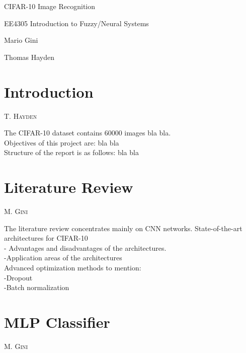 \documentclass[12pt, a4paper]{article}
\makeatletter
\newcommand{\sectionauthor}[1]{%
  {\parindent0pt\vspace*{-5pt}%
  \linespread{1.1}\large\scshape#1%
  \par\nobreak\vspace*{15pt}}
  \@afterheading%
}
\numberwithin{equation}{section}
\makeatother
\begin{document}
    \begin{titlepage}

    \begin{center}
    \vspace*{6cm}
    \centering
    \Huge
    { CIFAR-10 Image Recognition }
    \vspace{2cm}

    \Huge
    {EE4305 Introduction to Fuzzy/Neural Systems}
    \vspace{0.5cm}
    
    \Large
    {Mario Gini

    Thomas Hayden}
    \vfill
    \vspace{0.8cm}
    \end{center}
    \end{titlepage}

    \newpage
    \tableofcontents
\section{Introduction}
    \pagestyle{tom}
    \sectionauthor{T. Hayden}
    
The CIFAR-10 dataset contains 60000 images bla bla.\\
Objectives of this project are: bla bla\\
Structure of the report is as follows: bla bla\\

\section{Literature Review}
     \pagestyle{mario}
     \sectionauthor{M. Gini}
     
The literature review concentrates mainly on CNN networks. State-of-the-art architectures for CIFAR-10\\
- Advantages and disadvantages of the architectures.\\

-Application areas of the architectures\\

Advanced optimization methods to mention:\\
-Dropout\\
-Batch normalization\\

\section{MLP Classifier}
	    \pagestyle{mario}
	    \sectionauthor{M. Gini}
	
\end{document}
